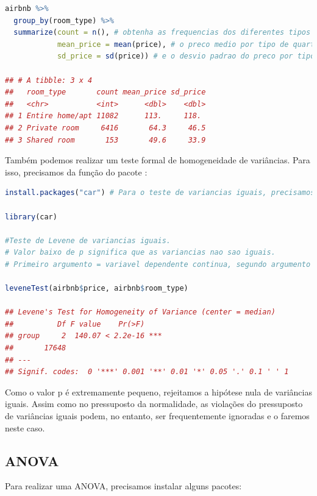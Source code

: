 \documentclass{article}
\begin{document}
\begin{lstlisting}[language=R]
airbnb %>% 
  group_by(room_type) %>% 
  summarize(count = n(), # obtenha as frequencias dos diferentes tipos de quartos
            mean_price = mean(price), # o preco medio por tipo de quarto
            sd_price = sd(price)) # e o desvio padrao do preco por tipo de quarto
            
## # A tibble: 3 x 4
##   room_type       count mean_price sd_price
##   <chr>           <int>      <dbl>    <dbl>
## 1 Entire home/apt 11082      113.     118. 
## 2 Private room     6416       64.3     46.5
## 3 Shared room       153       49.6     33.9
\end{lstlisting}

Também podemos realizar um teste formal de homogeneidade de variâncias. Para isso, precisamos da função  do pacote :

\begin{lstlisting}[language=R]
install.packages("car") # Para o teste de variancias iguais, precisamos de um pacote chamado car. Instalamos isso antes, portanto, nao eh necessario reinstala-lo se voce ja o tiver feito.

library(car)

#Teste de Levene de variancias iguais.
# Valor baixo de p significa que as variancias nao sao iguais.
# Primeiro argumento = variavel dependente continua, segundo argumento = variavel independente categorica.

leveneTest(airbnb$price, airbnb$room_type) 

## Levene's Test for Homogeneity of Variance (center = median)
##          Df F value    Pr(>F)    
## group     2  140.07 < 2.2e-16 ***
##       17648                      
## ---
## Signif. codes:  0 '***' 0.001 '**' 0.01 '*' 0.05 '.' 0.1 ' ' 1
\end{lstlisting}

Como o valor p é extremamente pequeno, rejeitamos a hipótese nula de variâncias iguais. Assim como no pressuposto da normalidade, as violações do pressuposto de variâncias iguais podem, no entanto, ser frequentemente ignoradas e o faremos neste caso.

\newpage

\subsection{ANOVA}

Para realizar uma ANOVA, precisamos instalar alguns pacotes:
\end{document}
